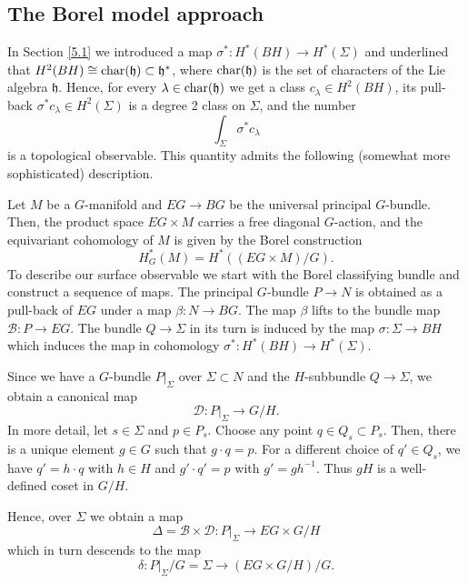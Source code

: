 \documentclass[11pt]{report}
\theoremstyle{plain}
\theoremstyle{definition}
\theoremstyle{remark}
\theoremstyle{remark}
\numberwithin{equation}{section}
\begin{document}



\subsection{The Borel model approach}

In Section \ref{5.1}  we introduced a map $\sigma^*: H^*(BH) \to H^*(\Sigma)$
and underlined that $H^2(BH) \cong {\rm char}(\mathfrak{h}) \subset \mathfrak{h}^*$, where ${\rm char}(\mathfrak{h})$ is the set of characters of the Lie algebra $\mathfrak{h}$. Hence, for every $\lambda \in {\rm char}(\mathfrak{h})$ we get a class $c_\lambda \in H^2(BH)$, its pull-back $\sigma^* c_\lambda \in H^2(\Sigma)$ is a degree 2 class on $\Sigma$, and the number 
%
$$
\int_\Sigma \sigma^* c_\lambda
$$
is a topological observable. This quantity admits the following (somewhat more sophisticated) description.

Let $M$ be a $G$-manifold and $EG \to BG$ be the universal principal $G$-bundle. Then, the product space $EG \times M$ carries a free diagonal $G$-action, and the equivariant cohomology of $M$ is given by the Borel construction
%
$$
H^*_G(M)=H^*((EG\times  M)/G).
$$
To describe our surface observable we start with  the Borel classifying bundle and construct a sequence of maps.
The principal $G$-bundle $P \to N$ is obtained as a pull-back of $EG$ under a map $\beta: N \to BG$. The map $\beta$ lifts to the bundle map $\mathcal{B}: P \to EG$. 
The bundle $Q \to \Sigma$ in its turn is induced by the map $\sigma: \Sigma \to BH$ which induces the map in cohomology $\sigma^*: H^*(BH) \to H^*(\Sigma)$.

Since we have a $G$-bundle $P|_\Sigma$ over $\Sigma \subset N$ and the $H$-subbundle $Q \to \Sigma$, we obtain a canonical map
%
$$
\mathcal{D}: P|_\Sigma \to G/H .
$$
In more detail, let $s \in \Sigma$ and $p \in P_s$. Choose any point $q \in Q_s \subset P_s$. Then, there is a unique element $g \in G$ such that $g \cdot q = p$. For a different choice of $q' \in Q_s$, we have $q'=h \cdot q$ with $h \in H$ and $g' \cdot q' = p$ with $g'=gh^{-1}$. Thus $gH$ is a well-defined coset in $G/H$. 

 Hence, over $\Sigma$ we obtain a map 
%
$$
\Delta = \mathcal{B} \times \mathcal{D}: P|_\Sigma \to EG \times G/H
$$
which in turn descends to the map
%
$$
\delta: P|_\Sigma/G = \Sigma \to (EG \times G/H)/G.
$$
\end{document}
